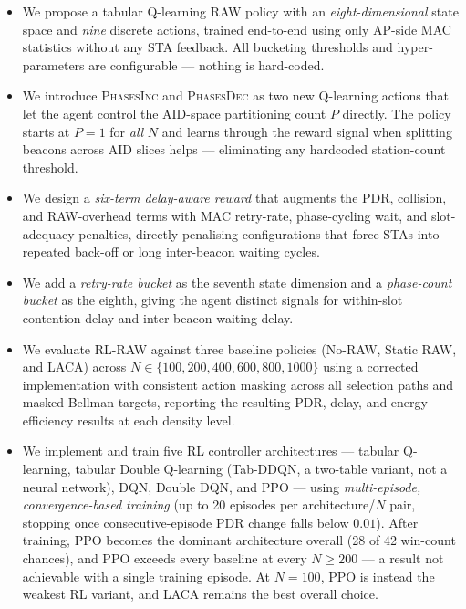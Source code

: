 \documentclass[conference]{IEEEtran}
\begin{document}
\begin{itemize}
  \item We propose a tabular Q-learning RAW policy with an
        \emph{eight-dimensional} state space and \emph{nine} discrete
        actions, trained end-to-end using only AP-side MAC statistics
        without any STA feedback.  All bucketing thresholds and
        hyper-parameters are configurable — nothing is hard-coded.
  \item We introduce \textsc{PhasesInc} and \textsc{PhasesDec} as two
        new Q-learning actions that let the agent control the AID-space
        partitioning count $P$ directly.  The policy starts at $P = 1$
        for \emph{all} $N$ and learns through the reward signal when
        splitting beacons across AID slices helps — eliminating any
        hardcoded station-count threshold.
  \item We design a \emph{six-term delay-aware reward} that augments the
        PDR, collision, and RAW-overhead terms with MAC retry-rate,
        phase-cycling wait, and slot-adequacy penalties, directly penalising
        configurations that force STAs into repeated back-off or long
        inter-beacon waiting cycles.
  \item We add a \emph{retry-rate bucket} as the seventh state dimension
        and a \emph{phase-count bucket} as the eighth, giving the agent
        distinct signals for within-slot contention delay and inter-beacon
        waiting delay.
  \item We evaluate RL-RAW against three baseline policies
        (No-RAW, Static RAW, and LACA) across
        $N \in \{100, 200, 400, 600, 800, 1000\}$ using a corrected
        implementation with consistent action masking across all selection
        paths and masked Bellman targets, reporting the resulting
        PDR, delay, and energy-efficiency results at each density level.
  \item We implement and train five RL controller architectures —
        tabular Q-learning, tabular Double Q-learning (Tab-DDQN, a
        two-table variant, not a neural network), DQN, Double DQN, and PPO
        — using \emph{multi-episode, convergence-based training} (up to 20
        episodes per architecture/$N$ pair, stopping once consecutive-episode
        PDR change falls below $0.01$).  After training, PPO becomes the
        dominant architecture overall (28 of 42 win-count chances), and PPO
        exceeds every baseline at every $N \geq 200$ — a result not
        achievable with a single training episode.  At $N=100$, PPO is
        instead the weakest RL variant, and LACA remains the best overall
        choice.
\end{itemize}
\end{document}
